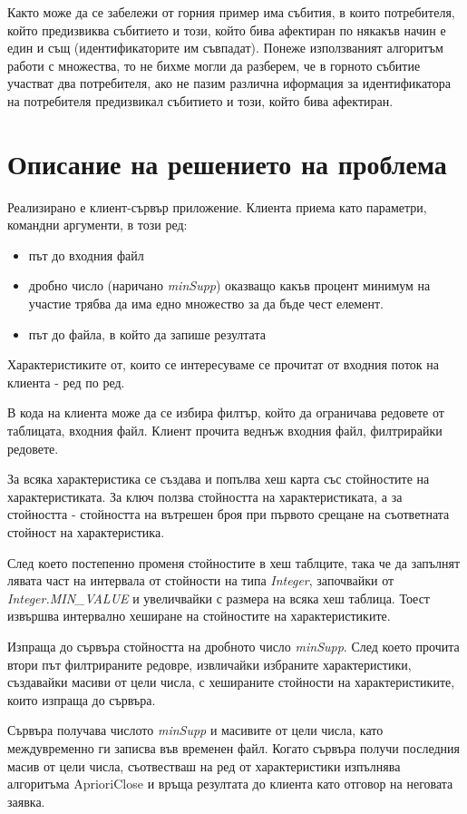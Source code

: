 \documentclass[a4paper, 12pt]{article}
\begin{document}
Както може да се забележи от горния пример има събития, в които потребителя,
който предизвиква събитието и този, който бива афектиран по някакъв начин е един и същ (идентификаторите им съвпадат).
Понеже използваният алгоритъм работи с множества, то не бихме могли да разберем, че в горното събитие участват два потребителя,
ако не пазим различна иформация за идентификатора на потребителя предизвикал събитието и този, който бива афектиран.

\section{Описание на решението на проблема}
Реализирано е клиент-сървър приложение.
Клиента приема като параметри, командни аргументи, в този ред:
\begin{itemize}
\item път до входния файл
\item дробно число (наричано \textit{minSupp}) оказващо какъв процент минимум на участие трябва да има едно множество за да бъде чест елемент.
\item път до файла, в който да запише резултата 
\end{itemize}
Характеристиките от, които се интересуваме се прочитат от входния поток на клиента - ред по ред.

В кода на клиента може да се избира филтър, който да ограничава редовете от таблицата, входния файл.
Клиент прочита веднъж входния файл, филтрирайки редовете.

За всяка характеристика се създава и попълва хеш карта със стойностите на характеристиката.
За ключ ползва стойността на характеристиката,
а за стойността - стойността на вътрешен броя при първото срещане на съответната стойност на характеристика.

След което постепенно променя стойностите в хеш таблците,
така че да запълнят лявата част на интервала от стойности на типа \textit{Integer},
започвайки от \textit{Integer.MIN\_VALUE} и увеличвайки с размера на всяка хеш таблица.
Тоест извършва интервално хеширане на стойностите на характеристиките.

Изпраща до сървъра стойността на дробното число \textit{minSupp}.
След което прочита втори път филтрираните редовре, извличайки избраните характеристики,
създавайки масиви от цели числа, с хешираните стойности на характеристиките, които изпраща до сървъра.

Сървъра получава числото \textit{minSupp} и масивите от цели числа, като междувременно ги записва във временен файл.
Когато сървъра получи последния масив от цели числа,
съотвестваш на ред от характеристики изпълнява алгоритъма AprioriClose и връща резултата до клиента като отговор на неговата заявка.
\end{document}
